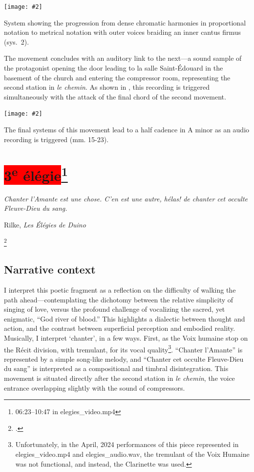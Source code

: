 \documentclass[12pt,twoside,maitrise]{dms_ks}
\newcommand{\customincludeexamples}[4][]{%
    \begin{example}[H]
        \centering
        \texttt{[image: \#2]}
        \caption{#4}
	\label{#3} 
    \end{example}
}
\theoremstyle{definition}
\begin{document}
{\customincludeexamples[width=\textwidth]{2e_2}{ex:2e_2}{System showing the progression from dense chromatic harmonies in proportional notation to metrical notation with outer voices braiding an inner cantus firmus (sys.~2).}

The movement concludes with an auditory link to the next---a sound sample of the protagonist opening the door leading to la salle Saint-Édouard in the basement of the church and entering the compressor room, representing the second station in \textit{le chemin}.
As shown in , this recording is triggered simultaneously with the attack of the final chord of the second movement.

\customincludeexamples[width=\textwidth]{2e_3}{ex:2e_3}{The final systems of this movement lead to a half cadence in A minor as an audio recording is triggered (mm. 15-23).}

\section{\colorbox{red}{3\textsuperscript{e} élégie}\footnote{06:23--10:47 in elegies\_video.mp4}}

\epigraph{\textit{Chanter l'Amante est une chose. C'en est une autre, hélas! de chanter cet occulte Fleuve-Dieu du sang.}}{Rilke, \textit{Les Élégies de Duino}\protect\footnotemark}

\footcitetext[29]{rilke_egies_1986}

\subsection{Narrative context}

I interpret this poetic fragment as a reflection on the difficulty of walking the path ahead---contemplating the dichotomy between the relative simplicity of singing of love, versus the profound challenge of vocalizing the sacred, yet enigmatic, “God river of blood.”  
This highlights a dialectic between thought and action, and the contrast between superficial perception and embodied reality.  
Musically, I interpret `chanter', in a few ways. 
First, as the Voix humaine stop on the Récit division, with tremulant, for its vocal quality\footnote{Unfortunately, in the April, 2024 performances of this piece represented in elegies\_video.mp4 and elegies\_audio.wav, the tremulant of the Voix Humaine was not functional, and instead, the Clarinette was used.}.  
“Chanter l'Amante” is represented by a simple song-like melody, and “Chanter cet occulte Fleuve-Dieu du sang” is interpreted as a compositional and timbral disintegration. 
This movement is situated directly after the second station in \textit{le chemin}, the voice entrance overlapping slightly with the sound of compressors.

}
\end{document}
